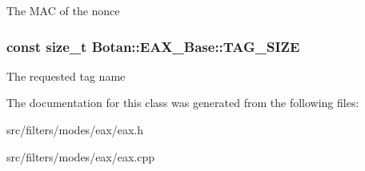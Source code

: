 The M\-A\-C of the nonce \hypertarget{classBotan_1_1EAX__Base_a0f7194e963f89bccdfb1801132f271a1}{
\subsubsection[{T\-A\-G\-\_\-\-S\-I\-Z\-E}]{\setlength{\rightskip}{0pt plus 5cm}const size\-\_\-t Botan\-::\-E\-A\-X\-\_\-\-Base\-::\-T\-A\-G\-\_\-\-S\-I\-Z\-E\hspace{0.3cm}{\ttfamily [protected]}}}\label{classBotan_1_1EAX__Base_a0f7194e963f89bccdfb1801132f271a1}
The requested tag name 

The documentation for this class was generated from the following files\-:\begin{DoxyCompactItemize}
\item 
src/filters/modes/eax/eax.\-h\item 
src/filters/modes/eax/eax.\-cpp\end{DoxyCompactItemize}
